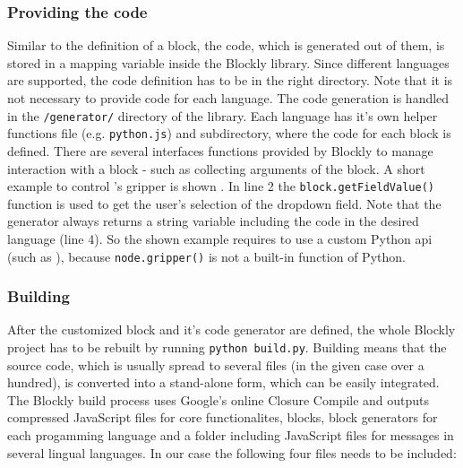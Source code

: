 \subsubsection{Providing the code}
Similar to the definition of a block, the code, which is generated out of them, is stored in a mapping variable inside the Blockly library. Since different languages are supported, the code definition has to be in the right directory. Note that it is not necessary to provide code for each language. The code generation is handled in the \lstinline!/generator/! directory of the library. Each language has it's own helper functions file (e.g. \lstinline!python.js!) and subdirectory, where the code for each block is defined. There are several interfaces functions provided by Blockly to manage interaction with a block - such as collecting arguments of the block. A short example to control \hobbit{}'s gripper is shown . In line 2 the \lstinline!block.getFieldValue()! function is used to get the user's selection of the dropdown field. Note that the generator always returns a string variable including the code in the desired language (line 4). So the shown example requires to use a custom Python \gls{api} (such as ), because \lstinline!node.gripper()! is not a built-in function of Python. \\

\begin{figure}[htbp]
	
\end{figure}

\subsubsection{Building}
After the customized block and it's code generator are defined, the whole Blockly project has to be rebuilt by running \lstinline!python build.py!. Building means that the source code, which is usually spread to several files (in the given case over a hundred), is converted into a stand-alone form, which can be easily integrated. The Blockly build process uses Google's online Closure Compile and outputs compressed JavaScript files for core functionalites, blocks, block generators for each progamming language and a folder including JavaScript files for messages in several lingual languages. In our case the following four files needs to be included:

